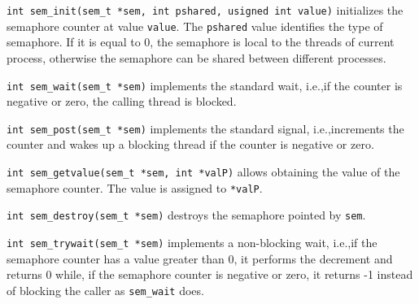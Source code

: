 \begin{description}
\item \texttt{int sem\_init(sem\_t *sem, int pshared, usigned int value)} initializes the semaphore counter at value \texttt{value}. The \texttt{pshared} value identifies the type of semaphore. If it is equal to 0, the semaphore is local to the threads of current process, otherwise the semaphore can be shared between different processes.

\item \texttt{int sem\_wait(sem\_t *sem)} implements the standard wait, i.e.,\@ if the counter is negative or zero, the calling thread is blocked.

\item \texttt{int sem\_post(sem\_t *sem)} implements the standard signal, i.e.,\@ increments the counter and wakes up a blocking thread if the counter is negative or zero.

\item \texttt{int sem\_getvalue(sem\_t *sem, int *valP)} allows obtaining the value of the semaphore counter. The value is assigned to \texttt{*valP}.

\item \texttt{int sem\_destroy(sem\_t *sem)} destroys the semaphore pointed by \texttt{sem}.

\item \texttt{int sem\_trywait(sem\_t *sem)} implements a non-blocking wait, i.e.,\@ if the semaphore counter has a value greater than 0, it performs the decrement and returns 0 while, if the semaphore counter is negative or zero, it returns -1 instead of blocking the caller as \texttt{sem\_wait} does.
\end{description}

